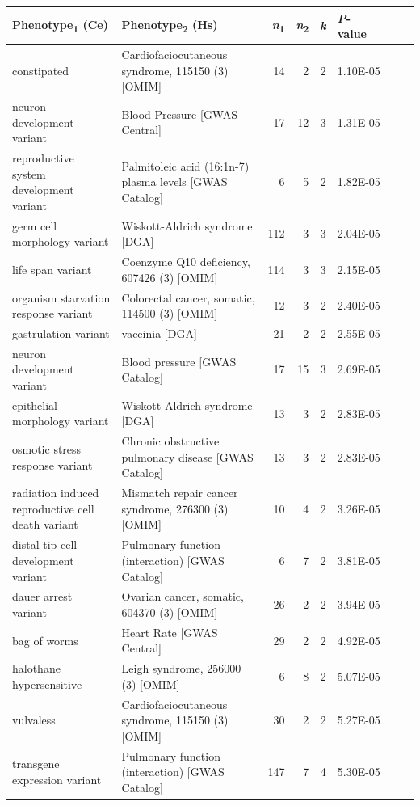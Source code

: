 \begin{table}
\tiny
\begin{tabulary}{\linewidth}{LLRRRL}
  Phenotype\textsubscript{1} (Ce) & Phenotype\textsubscript{2} (Hs) & \textsl{n}\textsubscript{1} & \textsl{n}\textsubscript{2} & \textsl{k} & \mbox{\textsl{P}-value~~~~~~} \\
  \hline
  constipated & Cardiofaciocutaneous syndrome, 115150 (3) [OMIM] & 14 & 2 & 2 & 1.10E-05 \\
  neuron development variant & Blood Pressure [GWAS Central] & 17 & 12 & 3 & 1.31E-05 \\
  reproductive system development variant & Palmitoleic acid (16:1n-7) plasma levels [GWAS Catalog] & 6 & 5 & 2 & 1.82E-05 \\
  germ cell morphology variant & Wiskott-Aldrich syndrome [DGA] & 112 & 3 & 3 & 2.04E-05 \\
  life span variant & Coenzyme Q10 deficiency, 607426 (3) [OMIM] & 114 & 3 & 3 & 2.15E-05 \\
  organism starvation response variant & Colorectal cancer, somatic, 114500 (3) [OMIM] & 12 & 3 & 2 & 2.40E-05 \\
  gastrulation variant & vaccinia [DGA] & 21 & 2 & 2 & 2.55E-05 \\
  neuron development variant & Blood pressure [GWAS Catalog] & 17 & 15 & 3 & 2.69E-05 \\
  epithelial morphology variant & Wiskott-Aldrich syndrome [DGA] & 13 & 3 & 2 & 2.83E-05 \\
  osmotic stress response variant & Chronic obstructive pulmonary disease [GWAS Catalog] & 13 & 3 & 2 & 2.83E-05 \\
  radiation induced reproductive cell death variant & Mismatch repair cancer syndrome, 276300 (3) [OMIM] & 10 & 4 & 2 & 3.26E-05 \\
  distal tip cell development variant & Pulmonary function (interaction) [GWAS Catalog] & 6 & 7 & 2 & 3.81E-05 \\
  dauer arrest variant & Ovarian cancer, somatic, 604370 (3) [OMIM] & 26 & 2 & 2 & 3.94E-05 \\
  bag of worms & Heart Rate [GWAS Central] & 29 & 2 & 2 & 4.92E-05 \\
  halothane hypersensitive & Leigh syndrome, 256000 (3) [OMIM] & 6 & 8 & 2 & 5.07E-05 \\
  vulvaless & Cardiofaciocutaneous syndrome, 115150 (3) [OMIM] & 30 & 2 & 2 & 5.27E-05 \\
  transgene expression variant & Pulmonary function (interaction) [GWAS Catalog] & 147 & 7 & 4 & 5.30E-05 \\

\end{tabulary}
\end{table}
